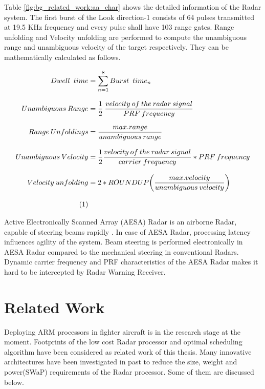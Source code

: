 Table \ref{fig:bg_related_work:aa_char} shows the detailed information of the Radar system. The first burst of the Look direction-1 consists of 64 pulses transmitted at 19.5 KHz frequency and every pulse shall have 103 range gates. Range unfolding and Velocity unfolding are performed to compute the unambiguous range and unambiguous velocity of the target respectively. They can be mathematically calculated as follows. 

\begin{align*}
	\label{equ:burst_time_calc}
	Dwell \enspace time &= \sum\limits_{n=1}^{8} Burst \enspace time_{n} \\[0.3cm]
	Unambiguous \: Range &= \frac{1}{2} \: \frac{velocity \: of \: the \: radar \: signal}{PRF \: frequency} \\[0.3cm]
	Range \: Unfoldings &= \frac{max.range}{unambiguous \: range} \\[0.3cm]
	Unambiguous \: Velocity &= \frac{1}{2} \frac{velocity \: of \: the \: radar \: signal}{carrier \: frequency} * PRF \: frequency \\[0.3cm]
	Velocity \: unfolding &= 2 * ROUNDUP \bigg( \frac{max.velocity}{unambiguous \: velocity} \bigg ) \\[0.3cm] \stepcounter{equation}\tag{\theequation} 
\end{align*}

Active Electronically Scanned Array (AESA) Radar is an airborne Radar, capable of steering beams rapidly \cite{aesaAbt}. In case of AESA Radar, processing latency influences agility of the system. Beam steering is performed electronically in AESA Radar compared to the mechanical steering in conventional Radars. Dynamic carrier frequency and PRF characteristics of the AESA Radar makes it hard to be intercepted by Radar Warning Receiver.

\section{Related Work}
\label{sec:related_work}
Deploying ARM processors in fighter aircraft is in the research stage at the moment. Footprints of the low cost Radar processor and optimal scheduling algorithm have been considered as related work of this thesis. Many innovative architectures have been investigated in past to reduce the size, weight and power(SWaP) requirements of the Radar processor. Some of them are discussed below.

